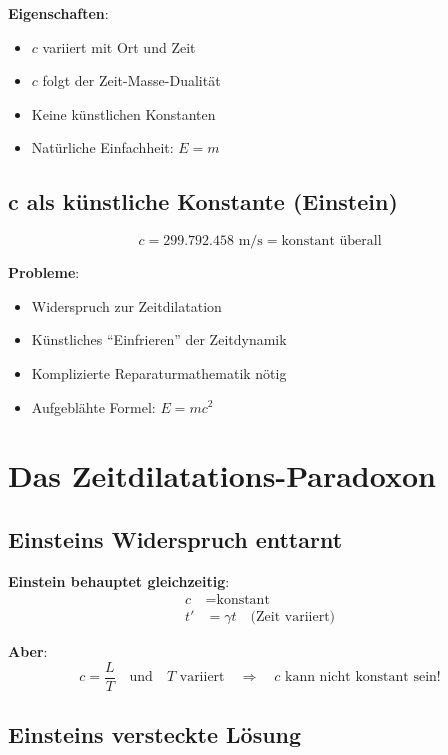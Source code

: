 	\textbf{Eigenschaften}:
	\begin{itemize}
		\item $c$ variiert mit Ort und Zeit
		\item $c$ folgt der Zeit-Masse-Dualität
		\item Keine künstlichen Konstanten
		\item Natürliche Einfachheit: $E = m$
	\end{itemize}
	
	\subsection{c als künstliche Konstante (Einstein)}
	
	\begin{equation}
		c = 299.792.458 \text{ m/s} = \text{konstant überall}
	\end{equation}
	
	\textbf{Probleme}:
	\begin{itemize}
		\item Widerspruch zur Zeitdilatation
		\item Künstliches ``Einfrieren'' der Zeitdynamik
		\item Komplizierte Reparaturmathematik nötig
		\item Aufgeblähte Formel: $E = mc^2$
	\end{itemize}
	
	\section{Das Zeitdilatations-Paradoxon}
	
	\subsection{Einsteins Widerspruch enttarnt}
	
	\textbf{Einstein behauptet gleichzeitig}:
	\begin{align}
		c &= \text{konstant} \\
		t' &= \gamma t \quad \text{(Zeit variiert)}
	\end{align}
	
	\textbf{Aber}:
	\begin{equation}
		c = \frac{L}{T} \quad \text{und} \quad T \text{ variiert} \quad \Rightarrow \quad c \text{ kann nicht konstant sein!}
	\end{equation}
	
	\subsection{Einsteins versteckte Lösung}
	
